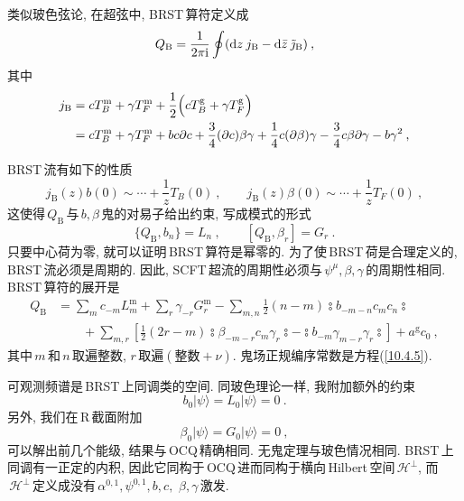 类似玻色弦论, 在超弦中, BRST\,算符定义成
\begin{equation}
    Q_{\text{B}} = \frac{1}{2\pi\mathrm{i}}\oint (\mathrm{d} z\: j_{\text{B}}-\mathrm{d}\bar{z}\: \tilde{\jmath}_{\text{B}})\:,\label{10.5.20}
\end{equation}
其中
\begin{align}
    j_{\text{B}} &= c T_{B}^{\text{m}} +\gamma T_{F}^{\text{m}} +\frac{1}{2} \Bigl( cT_{B}^{\text{g}}+\gamma T_{F}^{\text{g}}\Bigr) \nonumber \\
    &=  c T_{B}^{\text{m}} +\gamma T_{F}^{\text{m}} + b c\partial c + \frac{3}{4}(\partial c)\beta\gamma
    +\frac{1}{4}c(\partial\beta)\gamma-\frac{3}{4}c\beta \partial\gamma -b\gamma^{2}\:, \label{10.5.21}
\end{align}

BRST\,流有如下的性质
\begin{equation}
    j_{\text{B}}(z)b(0)\sim \cdots + \frac{1}{z}T_{B}(0) \:, \qquad
    j_{\text{B}}(z)\beta(0) \sim \cdots +\frac{1}{z} T_{F}(0) \:, \label{10.5.22}
\end{equation}
这使得$\,Q_{\text{B}}\,$与$\,b,\beta\,$鬼的对易子给出约束, 写成模式的形式
\begin{equation}
    \{Q_{\text{B}},b_{n}\} = L_{n}\:, \qquad [Q_{\text{B}},\beta_{r}]=G_{r}\:. \label{10.5.23}
\end{equation}
只要中心荷为零, 就可以证明\,BRST\,算符是幂零的. 为了使\,BRST\,荷是合理定义的, BRST\,流必须是周期的. 因此, SCFT\,超流的周期性必须与$\,\psi^{\mu},\beta,\gamma\,$的周期性相同. BRST\,算符的展开是
\begin{align}
    Q_{\text{B}} &= \sum_{m} c_{-m}L_{m}^{\text{m}} + \sum_{r}\gamma_{-r}G_{r}^{\text{m}} 
    -\sum_{m,n}\frac{1}{2}(n-m) \typecolon \!b_{-m-n} c_{m}c_{n}\typecolon  \nonumber \\
    &\qquad + \sum_{m,r}\left[\frac{1}{2}(2r-m)\typecolon \!\beta_{-m-r}c_{m}\gamma_{r}\!\typecolon
    - \typecolon\! b_{-m}\gamma_{m-r}\gamma_{r}\typecolon \right] + a^{\text{g}} c_{0} \:, \label{10.5.24}
\end{align}
其中$\,m\,$和$\,n\,$取遍整数, $r\,$取遍$(\text{整数}+\nu)$. 鬼场正规编序常数是方程(\ref{10.4.5}).

可观测频谱是\,BRST\,上同调类的空间. 同玻色理论一样, 我附加额外的约束
\begin{equation}
    b_{0}\lvert \psi\rangle = L_{0}\lvert\psi\rangle = 0 \:. \label{10.5.25} 
\end{equation}
另外, 我们在\,R\,截面附加
\begin{equation}
    \beta_{0}\lvert \psi \rangle = G_{0}\lvert \psi \rangle = 0\:, \label{10.5.26}
\end{equation}
可以解出前几个能级, 结果与\,OCQ\,精确相同. 无鬼定理与玻色情况相同. BRST\,上同调有一正定的内积, 因此它同构于\,OCQ\,进而同构于横向\,Hilbert\,空间$\,\mathscr{H}^{\bot}$, 而$\,\mathscr{H}^{\bot}\,$定义成没有$\,\alpha^{0,1},\psi^{0,1},b,c,$ $\beta,\gamma\,$激发. 

